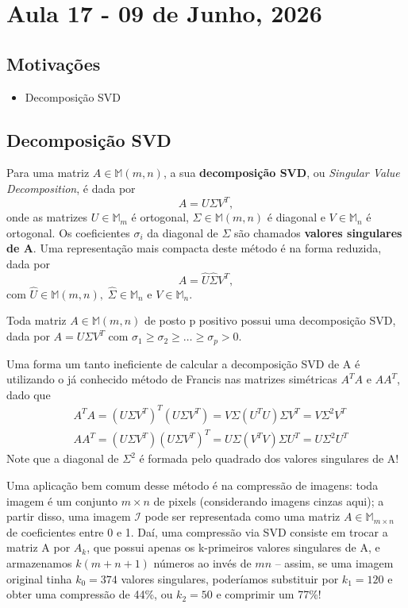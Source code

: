 \documentclass[../numerical_methods.tex]{subfiles}
\begin{document}
\section{Aula 17 - 09 de Junho, 2026}
\subsection{Motivações}
\begin{itemize}
	\item Decomposição SVD
\end{itemize}
\subsection{Decomposição SVD}
Para uma matriz \(A\in \mathbb{M}(m, n)\), a sua \textbf{decomposição SVD}, ou \textit{Singular Value Decomposition}, é dada por
\[
	\boxed{A = U \Sigma V^{T}},
\]
onde as matrizes \(U\in \mathbb{M}_{m}\) é ortogonal, \(\Sigma \in \mathbb{M}(m, n)\) é diagonal e \(V\in \mathbb{M}_{n}\) é ortogonal.
Os coeficientes \(\sigma_{i}\) da diagonal de \(\Sigma \) são chamados \textbf{valores singulares de A}.
Uma representação mais compacta deste método é na forma reduzida, dada por
\[
	A = \hat{U}\hat{\Sigma }V^{T},
\]
com \(\hat{U}\in \mathbb{M}(m, n),\; \hat{\Sigma }\in \mathbb{M}_{n}\) e \(V\in \mathbb{M}_{n}\).

\begin{theorem*}
	Toda matriz \(A\in \mathbb{M}(m, n)\) de posto p positivo possui uma decomposição SVD, dada por \(A = U\Sigma V^{T}\) com \(\sigma_1\geq \sigma_2\geq \dotsc \geq \sigma_p > 0\).
\end{theorem*}
Uma forma um tanto ineficiente de calcular a decomposição SVD de A é utilizando o já conhecido método de Francis nas matrizes simétricas \(A^{T}A\) e \(AA^{T}\), dado que
\begin{align*}
	 & A^{T}A = (U\Sigma V^{T})^{T}(U\Sigma V^{T}) = V\Sigma (U^{T}U)\Sigma V^{T} = V\Sigma^{2}V^{T} \\
	 & AA^{T} = (U\Sigma V^{T})(U\Sigma V^{T})^{T} = U\Sigma (V^{T}V)\Sigma U^{T} = U\Sigma^{2}U^{T}
\end{align*}
Note que a diagonal de \(\Sigma^{2}\) é formada pelo quadrado dos valores singulares de A!

Uma aplicação bem comum desse método é na compressão de imagens: toda imagem é um conjunto \(m\times n\) de pixels (considerando imagens cinzas aqui); a partir disso, uma imagem \(\mathcal{I}\) pode ser representada como uma matriz \(A\in \mathbb{M}_{m\times n}\) de coeficientes entre 0 e 1.
Daí, uma compressão via SVD consiste em trocar a matriz A por \(A_{k}\), que possui apenas os k-primeiros valores singulares de A, e armazenamos \(k(m+n+1)\) números ao invés de \(mn\) -- assim, se uma imagem original tinha \(k_{0}=374\) valores singulares, poderíamos substituir por \(k_1=120\) e obter uma compressão de 44\%, ou \(k_2 = 50\) e comprimir um 77\%!
\end{document}
